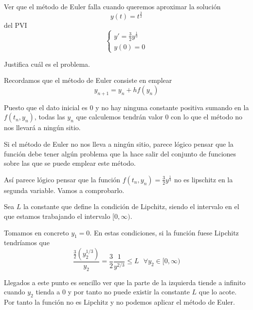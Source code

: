 \begin{problem}[2]
Ver que el método de Euler falla cuando queremos aproximar la solución
\[y(t) = t^{\frac{3}{2}}\]
del PVI
\[\left\{ \begin{array}{l}y'=\frac{3}{2}y^{\frac{1}{3}} \\
y(0)=0\end{array}
\right.\]

Justifica cuál es el problema.

\solution
{}

Recordamos que el método de Euler consiste en emplear
\[y_{n+1} = y_n + h f(y_n)\]

Puesto que el dato inicial es 0 y no hay ninguna constante positiva sumando en la $f(t_n,y_n)$, todas las $y_n$ que calculemos tendrán valor 0 con lo que el método no nos llevará a ningún sitio.

Si el método de Euler no nos lleva a ningún sitio, parece lógico pensar que la función debe tener algún problema que la hace salir del conjunto de funciones sobre las que se puede emplear este método.

Así parece lógico pensar que la función $f(t_n,y_n)=\frac{3}{2}y^{\frac{1}{3}}$ no es lipschitz en la segunda variable. Vamos a comprobarlo.

Sea $L$ la constante que define la condición de Lipchitz, siendo el intervalo en el que estamos trabajando el intervalo $[0, \infty)$. 

Tomamos en concreto $y_1=0$. En estas condiciones, si la función fuese Lipchitz tendríamos que 
\[\frac{\frac{3}{2}(y_2^{1/3})}{y_2} = \frac{3}{2}\frac{1}{y^{2/3}}\leq L \ \ \ \forall y_2 \in [0,\infty)\]

Llegados a este punto es sencillo ver que la parte de la izquierda tiende a infinito cuando $y_2$ tienda a 0 y por tanto no puede existir la constante $L$ que lo acote. Por tanto la función no es Lipchitz y no podemos aplicar el método de Euler.
\end{problem}

